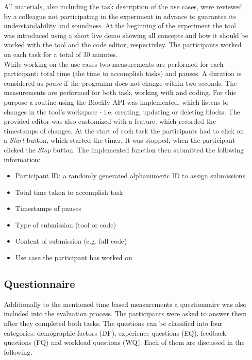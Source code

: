 All materials, also including the task description of the use cases, were reviewed by a colleague not participating in the experiment in advance to guarantee its understandability and soundness. At the beginning of the experiment the tool was introduced using a short live demo showing all concepts and how it should be worked with the tool and the code editor, respectivley. The participants worked on each task for a total of 30 minutes. \\

While working on the use cases two measurements are performed for each participant: total time (the time to accomplish tasks) and pauses. A duration is considered as \textit{pause} if the programm does not change within two seconds. The measurements are performed for both task, working with \toolname{} and coding. For this purpose a routine using the Blockly API was implemented, which listens to changes in the tool's workspace - i.e. creating, updating or deleting blocks. The provided editor was also customized with a feature, which recorded the timestamps of changes. At the start of each task the participants had to click on a \textit{Start} button, which started the timer. It was stopped, when the participant clicked the \textit{Stop} button. The implemented function then submitted the following information:

\begin{itemize}
    \item Participant ID: a randomly generated alphanumeric ID to assign submissions
    \item Total time taken to accomplish task
    \item Timestamps of pauses
    \item Type of submission (tool or code)
    \item Content of submission (e.g. full code)
    \item Use case the participant has worked on
\end{itemize}

\subsection{Questionnaire} \label{sec:Questionnaire}
Additionally to the mentioned time based measurements a questionnaire was also included into the evaluation process. The participants were asked to answer them after they completed both tasks. The questions can be classified into four categories: demographic factors (DF), experience questions (EQ), feedback questions (FQ) and workload questions (WQ). Each of them are discussed in the following.

